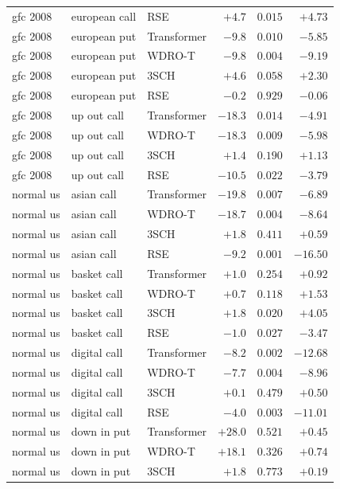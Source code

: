 \documentclass[11pt,oneside]{report}
\begin{document}
\begin{longtable}{lllrrr}
gfc 2008 & european call & RSE      & $+4.7$  & $0.015$ & $+4.73$ \\
gfc 2008 & european put & Transformer & $-9.8$  & $0.010$ & $-5.85$ \\
gfc 2008 & european put & WDRO-T    & $-9.8$  & $0.004$ & $-9.19$ \\
gfc 2008 & european put & 3SCH      & $+4.6$  & $0.058$ & $+2.30$ \\
gfc 2008 & european put & RSE       & $-0.2$  & $0.929$ & $-0.06$ \\
gfc 2008 & up out call & Transformer & $-18.3$ & $0.014$ & $-4.91$ \\
gfc 2008 & up out call & WDRO-T     & $-18.3$ & $0.009$ & $-5.98$ \\
gfc 2008 & up out call & 3SCH       & $+1.4$  & $0.190$ & $+1.13$ \\
gfc 2008 & up out call & RSE        & $-10.5$ & $0.022$ & $-3.79$ \\
\midrule
normal us & asian call & Transformer & $-19.8$ & $0.007$ & $-6.89$ \\
normal us & asian call & WDRO-T      & $-18.7$ & $0.004$ & $-8.64$ \\
normal us & asian call & 3SCH        & $+1.8$  & $0.411$ & $+0.59$ \\
normal us & asian call & RSE         & $-9.2$  & $0.001$ & $-16.50$ \\
normal us & basket call & Transformer & $+1.0$  & $0.254$ & $+0.92$ \\
normal us & basket call & WDRO-T     & $+0.7$  & $0.118$ & $+1.53$ \\
normal us & basket call & 3SCH       & $+1.8$  & $0.020$ & $+4.05$ \\
normal us & basket call & RSE        & $-1.0$  & $0.027$ & $-3.47$ \\
normal us & digital call & Transformer & $-8.2$  & $0.002$ & $-12.68$ \\
normal us & digital call & WDRO-T    & $-7.7$  & $0.004$ & $-8.96$ \\
normal us & digital call & 3SCH      & $+0.1$  & $0.479$ & $+0.50$ \\
normal us & digital call & RSE       & $-4.0$  & $0.003$ & $-11.01$ \\
normal us & down in put & Transformer & $+28.0$ & $0.521$ & $+0.45$ \\
normal us & down in put & WDRO-T     & $+18.1$ & $0.326$ & $+0.74$ \\
normal us & down in put & 3SCH       & $+1.8$  & $0.773$ & $+0.19$ \\

\end{longtable}
\end{document}

